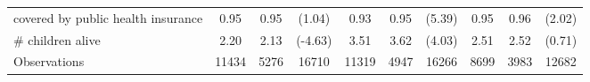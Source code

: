 \begin{tabular}{lccccccccc}
covered by public health insurance&        0.95&        0.95&      (1.04)         &        0.93&        0.95&      (5.39)\sym{***}&        0.95&        0.96&      (2.02)\sym{*}  \\
\# children alive    &        2.20&        2.13&     (-4.63)\sym{***}&        3.51&        3.62&      (4.03)\sym{***}&        2.51&        2.52&      (0.71)         \\
\hline
Observations        &       11434&        5276&       16710         &       11319&        4947&       16266         &        8699&        3983&       12682         \\
\end{tabular}
